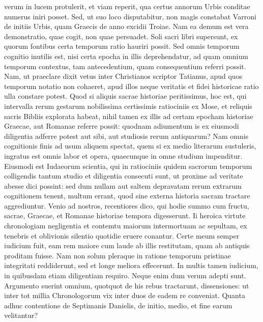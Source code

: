 verum in lucem protulerit, et viam reperit, qua certus
annorum Urbis conditae numerus iniri posset.
%
Sed, ut suo loco disputabitur,
non magis constabat Varroni de initiis Urbis, quam Graecis de
anno excidii Troiae.
Nam ea demum est vera demonstratio, quae cogit,
non quae persuadet.
Soli sacri libri supersunt, ex quorum fontibus
certa temporum ratio hauriri possit.
Sed omnis temporum cognitio
inutilis est, nisi certa epocha in illis deprehendatur, ad quam omnium
temporum contextus, tam antecedentium, quam consequentium referri
possit.
Nam, ut praeclare dixit vetus inter Christianos scriptor
Tatianus, apud quos temporum notatio non cohaeret, apud illos neque
veritatis et fidei historicae ratio ulla constare potest.
Quod si aliquis
sacrae historiae peritissimus, hoc est, qui intervalla rerum gestarum
nobilissima certissimis ratiociniis ex Mose, et
 reliquis sacris Bibliis explorata
habeat, nihil tamen ex illis ad certam epocham historiae Graecae,
aut Romanae referre possit: quodnam adiumentum is ex eiusmodi
diligentia adferre potest aut sibi, aut studiosis rerum antiquarum?
Nam omnis cognitionis finis ad usum aliquem spectat, quem si ex medio
literarum sustuleris, ingratus est omnis labor et opera, quaecunque
in omne studium impenditur.
Eiusmodi est Iudaeorum scientia, qui
in ratiociniis quidem sacrorum temporum colligendis tantum studio
et diligentia consecuti sunt, ut proxime ad veritate abesse dici possint: sed
dum nullam aut saltem depravatam rerum extrarum cognitionem
tenent, multum errant, quod sine externa historia sacram tractare
aggrediuntur.
Venio ad nostros, recentiores dico, qui hodie summo
cum fructu, sacrae, Graecae, et Romanae historiae tempora digesserunt.
Ii heroica virtute chronologiam negligentia et contemtu maiorum
intermortuam ac sepultam, ex tenebris et oblivionis silentio quotidie
eruere conantur.
Certe meum semper iudicium fuit, eam rem maiore
cum laude ab illis restitutam, quam ab antiquis proditam fuisse.
Nam
non solum pleraque in ratione temporum pristinae integritati reddiderunt,
sed et longe meliora effecerunt.
In multis tamen iudicium, in quibusdam
etiam diligentiam requiro.
Neque enim dum verum adepti sunt.
Argumento suerint omnium, quotquot de his rebus tractarunt,
 dissensiones:
ut inter tot millia Chronologorum vix inter duos de eadem re
conveniat.
Quanta adhuc contentione de Septimanis Danielis, de initio,
medio, et fine earum velitantur?
